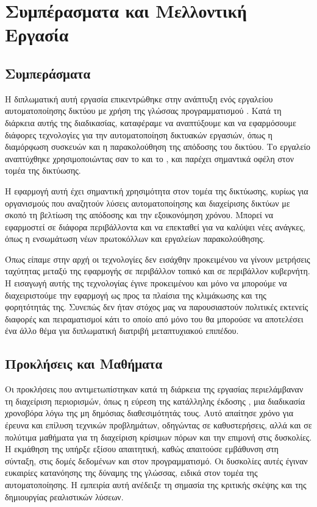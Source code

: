 
\chapter{Συμπέρασματα και Μελλοντική Εργασία}

\section{Συμπεράσματα}

Η διπλωματική αυτή εργασία επικεντρώθηκε στην ανάπτυξη ενός εργαλείου αυτοματοποίησης 
δικτύου με χρήση της γλώσσας προγραμματισμού . 
Κατά τη διάρκεια αυτής της διαδικασίας, καταφέραμε να αναπτύξουμε και να 
εφαρμόσουμε διάφορες τεχνολογίες για την αυτοματοποίηση δικτυακών εργασιών, 
όπως η διαμόρφωση συσκευών και η παρακολούθηση της απόδοσης του δικτύου. 
Το εργαλείο αναπτύχθηκε χρησιμοποιώντας σαν  το  και το , 
και παρέχει σημαντικά οφέλη στον τομέα της δικτύωσης.


Η εφαρμογή αυτή έχει σημαντική χρησιμότητα στον τομέα της δικτύωσης, 
κυρίως για οργανισμούς που αναζητούν λύσεις αυτοματοποίησης και 
διαχείρισης δικτύων με σκοπό τη βελτίωση της απόδοσης και την 
εξοικονόμηση χρόνου. Μπορεί να εφαρμοστεί σε διάφορα περιβάλλοντα και 
να επεκταθεί για να καλύψει νέες ανάγκες, όπως η ενσωμάτωση νέων πρωτοκόλλων 
και εργαλείων παρακολούθησης.

Όπως είπαμε στην αρχή οι τεχνολογίες  δεν εισάχθην προκειμένου
να γίνουν μετρήσεις ταχύτητας μεταξύ της εφαρμογής σε περιβάλλον τοπικό και σε περιβάλλον κυβερνήτη.
Η εισαγωγή αυτής της τεχνολογίας έγινε προκειμένου και μόνο να μπορούμε να διαχειριστούμε την εφαρμογή
ως προς τα πλαίσια της κλιμάκωσης και της φορητότητάς της. Συνεπώς δεν ήταν στόχος μας να παρουσιαστούν πολιτικές
εκτενείς διαφορές και πειραματισμοί κάτι το οποίο από μόνο του θα μπορούσε να αποτελέσει ένα άλλο θέμα για
διπλωματική διατριβή μεταπτυχιακού επιπέδου.

\section{Προκλήσεις και Μαθήματα}


Οι προκλήσεις που αντιμετωπίστηκαν κατά τη διάρκεια της 
εργασίας περιελάμβαναν τη διαχείριση περιορισμών, όπως η 
εύρεση της κατάλληλης έκδοσης , μια διαδικασία 
χρονοβόρα λόγω της μη δημόσιας διαθεσιμότητάς τους. 
Αυτό απαίτησε χρόνο για έρευνα και επίλυση τεχνικών προβλημάτων, 
οδηγώντας σε καθυστερήσεις, αλλά και σε πολύτιμα μαθήματα για τη 
διαχείριση κρίσιμων πόρων και την επιμονή στις δυσκολίες. Η εκμάθηση 
της  υπήρξε εξίσου απαιτητική, καθώς απαιτούσε 
εμβάθυνση στη σύνταξη, στις δομές δεδομένων και στον προγραμματισμό. 
Οι δυσκολίες αυτές έγιναν ευκαιρίες κατανόησης της δύναμης της 
γλώσσας, ειδικά στον τομέα της αυτοματοποίησης. Η εμπειρία αυτή 
ανέδειξε τη σημασία της κριτικής σκέψης και της δημιουργίας 
ρεαλιστικών λύσεων.

